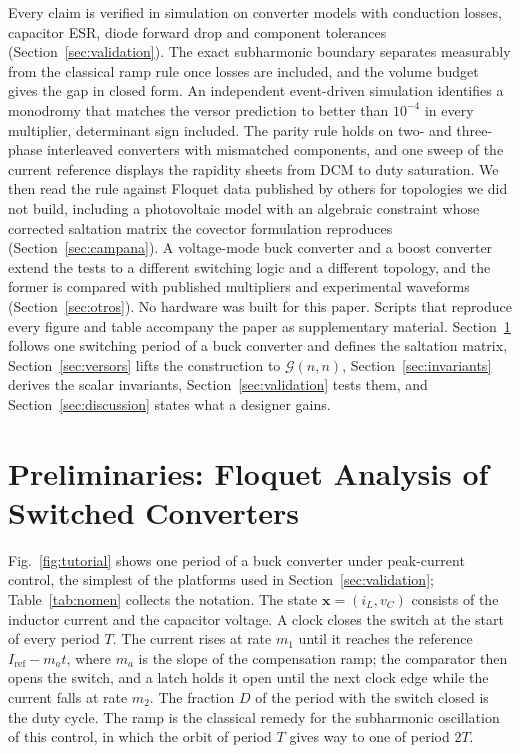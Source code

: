 \documentclass[journal]{IEEEtran}
\newcommand{\Gnn}{\mathcal{G}(n,n)}
\begin{document}
Every claim is verified in simulation on converter models with conduction
losses, capacitor ESR, diode forward drop and component tolerances
(Section~\ref{sec:validation}). The exact subharmonic boundary separates
measurably from the classical ramp rule once losses are included, and the
volume budget gives the gap in closed form. An independent event-driven
simulation identifies a monodromy that matches the versor prediction to
better than $10^{-4}$ in every multiplier, determinant sign included. The
parity rule holds on two- and three-phase interleaved converters with
mismatched components, and one sweep of the current reference displays the
rapidity sheets from DCM to duty saturation. We then read the rule against
Floquet data published by others for topologies we did not build, including
a photovoltaic model with an algebraic constraint whose corrected saltation
matrix \cite{hayes2020application} the covector formulation reproduces
(Section~\ref{sec:campana}). A voltage-mode buck converter and a boost
converter extend the tests to a different switching logic and a different
topology, and the former is compared with published multipliers and
experimental waveforms \cite{giaouris2008stability}
(Section~\ref{sec:otros}). No hardware was built for this paper. Scripts that
reproduce every figure and table accompany the paper as supplementary
material. Section~\ref{sec:prelim} follows one switching period of a buck
converter and defines the saltation matrix, Section~\ref{sec:versors} lifts
the construction to $\Gnn$, Section~\ref{sec:invariants} derives the scalar
invariants, Section~\ref{sec:validation} tests them, and
Section~\ref{sec:discussion} states what a designer gains.

\section{Preliminaries: Floquet Analysis of Switched Converters}
\label{sec:prelim}
Fig.~\ref{fig:tutorial} shows one period of a buck converter under
peak-current control, the simplest of the platforms used in
Section~\ref{sec:validation}; Table~\ref{tab:nomen} collects the notation.
The state $\bm{x}=(i_L,v_C)$ consists of the inductor current and the
capacitor voltage. A clock closes the switch at the start of every period
$T$. The current rises at rate $m_1$ until it reaches the reference
$I_{\mathrm{ref}}-m_at$, where $m_a$ is the slope of the compensation ramp;
the comparator then opens the switch, and a latch holds it open until the
next clock edge while the current falls at rate $m_2$. The fraction $D$ of
the period with the switch closed is the duty cycle. The ramp is the
classical remedy for the subharmonic oscillation of this control, in which
the orbit of period $T$ gives way to one of period $2T$.
\end{document}

